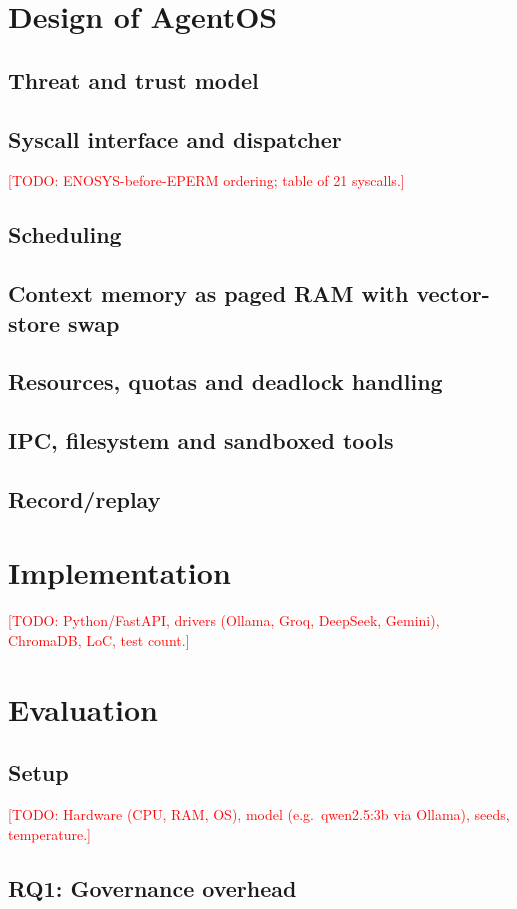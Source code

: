 \documentclass[conference,letterpaper]{IEEEtran}
\newcommand{\todo}[1]{\textcolor{red}{[TODO: #1]}}
\begin{document}
\section{Design of AgentOS}\label{sec:design}
\subsection{Threat and trust model}
\subsection{Syscall interface and dispatcher}
\todo{ENOSYS-before-EPERM ordering; table of 21 syscalls.}
\subsection{Scheduling}
\subsection{Context memory as paged RAM with vector-store swap}
\subsection{Resources, quotas and deadlock handling}
\subsection{IPC, filesystem and sandboxed tools}
\subsection{Record/replay}

\section{Implementation}\label{sec:impl}
\todo{Python/FastAPI, drivers (Ollama, Groq, DeepSeek, Gemini), ChromaDB, LoC, test count.}

\section{Evaluation}\label{sec:eval}
\subsection{Setup}
\todo{Hardware (CPU, RAM, OS), model (e.g.\ qwen2.5:3b via Ollama), seeds, temperature.}
\subsection{RQ1: Governance overhead}
\end{document}
